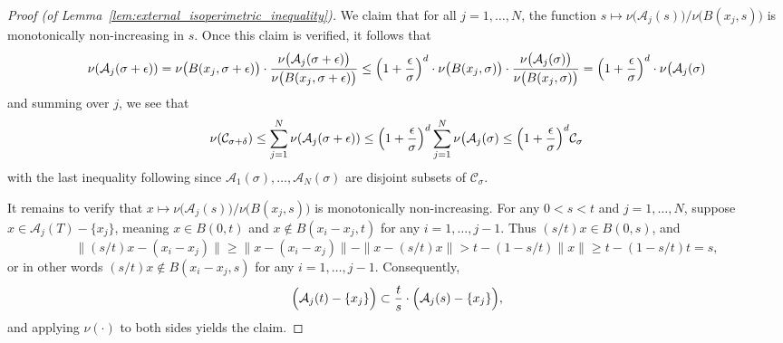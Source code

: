 \documentclass{article}
\newcommand{\1}{\mathbf{1}}
\newcommand{\mc}[1]{\mathcal{#1}}
\theoremstyle{definition}
\theoremstyle{remark}
\begin{document}
\begin{proof}[Proof (of Lemma~\ref{lem:external_isoperimetric_inequality})]
	We claim that for all $j = 1,\ldots,N$, the function $s \mapsto \nu\bigl(\mc{A}_j(s)\bigr)/\nu\bigl(B(x_j,s)\bigr)$ is monotonically non-increasing in $s$. Once this claim is verified, it follows that
	\begin{equation*}
	\nu(\mc{A}_j(\sigma + \epsilon)) = \nu\bigl(B(x_j,\sigma + \epsilon)\bigr) \cdot \frac{\nu\bigl(\mc{A}_j(\sigma + \epsilon)\bigr)}{\nu\bigl(B(x_j,\sigma + \epsilon)\bigr)} \leq \Bigl(1 + \frac{\epsilon}{\sigma}\Bigr)^d \cdot  \nu\bigl(B(x_j,\sigma)\bigr) \cdot \frac{\nu\bigl(\mc{A}_j(\sigma)\bigr)}{\nu\bigl(B(x_j,\sigma)\bigr)} = \Bigl(1 + \frac{\epsilon}{\sigma}\Bigr)^d \cdot \nu\bigl(\mc{A}_j(\sigma)
	\end{equation*}
	and summing over $j$, we see that
	\begin{equation*}
	\nu(\mc{C}_{\sigma + \delta}) \leq \sum_{j = 1}^{N} \nu(\mc{A}_j(\sigma + \epsilon)) \leq \Bigl(1 + \frac{\epsilon}{\sigma}\Bigr)^d \sum_{j = 1}^{N} \nu\bigl(\mc{A}_j(\sigma) \leq \Bigl(1 + \frac{\epsilon}{\sigma}\Bigr)^d \mc{C}_{\sigma}
	\end{equation*}
	with the last inequality following since $\mc{A}_1(\sigma),\ldots,\mc{A}_N(\sigma)$ are disjoint subsets of $\mc{C}_{\sigma}$.
	
	It remains to verify that $x \mapsto \nu\bigl(\mc{A}_j(s)\bigr)/\nu\bigl(B(x_j,s)\bigr)$ is monotonically non-increasing. For any $0 < s < t$ and $j = 1,\ldots,N$, suppose $x \in \mc{A}_j(T) - \{x_j\}$, meaning $x \in B(0,t)$ and $x \not\in B(x_i - x_j,t)$ for any $i = 1,\ldots,j - 1$. Thus $(s/t)x \in B(0,s)$, and
	\begin{equation*}
	\|(s/t)x - (x_i - x_j)\| \geq \|x - (x_i - x_j)\| - \|x - (s/t)x\| > t - (1 - s/t)\|x\| \geq t - (1 - s/t)t = s,
	\end{equation*}
	or in other words $(s/t)x \not\in B(x_i - x_j,s)$ for any $i = 1,\ldots,j - 1$. Consequently,
	\begin{equation*}
	\Bigl(\mc{A}_j(t) - \{x_j\}\Bigr) \subset \frac{t}{s} \cdot \Bigl(\mc{A}_{j}(s)- \{x_j\}\Bigr),
	\end{equation*}
	and applying $\nu(\cdot)$ to both sides yields the claim.
\end{proof}
	
\end{document}
